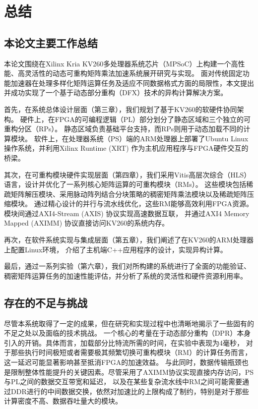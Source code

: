 \chapter{总结}

\section{本论文主要工作总结}

本论文围绕在Xilinx Kria KV260多处理器系统芯片（MPSoC）上构建一个高性能、高灵活性的动态可重构矩阵乘法加速系统展开研究与实现。
面对传统固定功能加速器在处理多样化矩阵运算任务及适应不同数据格式方面的局限性，本文提出并成功实现了一个基于动态部分重构（DFX）技术的异构计算解决方案。

首先，在系统总体设计层面（第三章），我们规划了基于KV260的软硬件协同架构。
硬件上，在FPGA的可编程逻辑（PL）部分划分了静态区域和三个独立的可重构分区（RPs）。
静态区域负责基础平台支持，而RPs则用于动态加载不同的计算模块。
软件上，在处理器系统（PS）端的ARM处理器上部署了Ubuntu Linux操作系统，并利用Xilinx Runtime (XRT) 作为主机应用程序与FPGA硬件交互的桥梁。

其次，在可重构模块硬件实现层面（第四章），我们采用Vitis高层次综合（HLS）语言，设计并优化了一系列核心矩阵运算的可重构模块（RMs）。
这些模块包括稀疏矩阵解压模块、采用脉动阵列结合分块策略的稠密矩阵乘法模块以及稀疏矩阵压缩模块。
通过精心设计的并行与流水线优化，这些RM能够高效利用FPGA资源。模块间通过AXI4-Stream (AXIS) 协议实现高速数据互联，
并通过AXI4 Memory Mapped (AXIMM) 协议直接访问KV260的系统内存。

再次，在软件系统实现与集成层面（第五章），我们阐述了在KV260的ARM处理器上配置Linux环境，
介绍了主机端C++应用程序的设计，实现异构计算。

最后，通过一系列实验（第六章），我们对所构建的系统进行了全面的功能验证、
稠密矩阵运算任务的加速性能评估，并分析了系统的灵活性和硬件资源利用率。

\section{存在的不足与挑战}

尽管本系统取得了一定的成果，但在研究和实现过程中也清晰地揭示了一些固有的不足之处以及面临的技术挑战。
一个核心的考量在于动态部分重构（DPR）本身引入的开销。具体而言，加载部分比特流所需的时间，在实验中表现为4毫秒，
对于那些执行时间极短或者需要极其频繁切换可重构模块（RM）的计算任务而言，这一延迟可能显著影响甚至抵消FPGA的加速效益。
与此同时，数据传输瓶颈也是限制整体性能提升的关键因素。尽管采用了AXIMM协议实现直接内存访问，PS与PL之间的数据交互带宽和延迟，
以及在某些复杂流水线中RM之间可能需要通过DDR进行的中间数据交换，依然对加速比的上限构成了制约，特别是对于那些计算密度不高、数据吞吐量大的模块。

